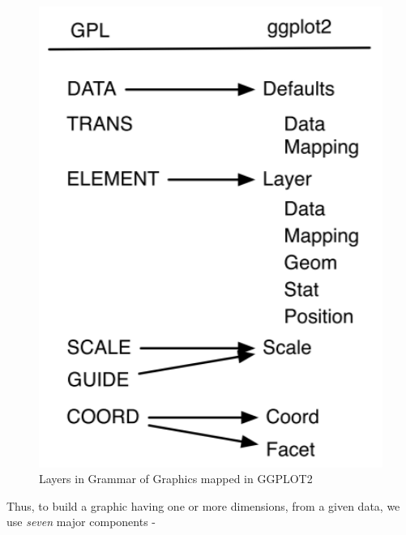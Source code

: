 \documentclass[
]{book}
\begin{document}
\begin{figure}

{\centering \includegraphics[width=5.25in,height=0.75\textheight]{images/layers_gg} 

}

\caption{Layers in Grammar of Graphics mapped in GGPLOT2}\label{fig:unnamed-chunk-207}
\end{figure}

Thus, to build a graphic having one or more dimensions, from a given data, we use \emph{seven} major components -
\end{document}
